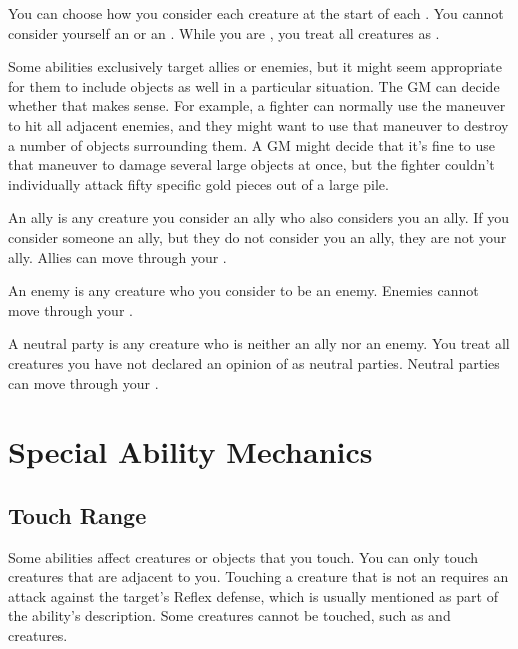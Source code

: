     You can choose how you consider each creature at the start of each .
    You cannot consider yourself an  or an .
    While you are \unconscious, you treat all creatures as .

    Some abilities exclusively target allies or enemies, but it might seem appropriate for them to include objects as well in a particular situation.
    The GM can decide whether that makes sense.
    For example, a fighter can normally use the  maneuver to hit all adjacent enemies, and they might want to use that maneuver to destroy a number of objects surrounding them.
    A GM might decide that it's fine to use that maneuver to damage several large objects at once, but the fighter couldn't individually attack fifty specific gold pieces out of a large pile.

     An ally is any creature you consider an ally who also considers you an ally.
    If you consider someone an ally, but they do not consider you an ally, they are not your ally.
    Allies can move through your .

     An enemy is any creature who you consider to be an enemy.
    Enemies cannot move through your .

     A neutral party is any creature who is neither an ally nor an enemy.
    You treat all creatures you have not declared an opinion of as neutral parties.
    Neutral parties can move through your .

\section{Special Ability Mechanics}\label{Special Ability Mechanics}

  \subsection{Touch Range}
    Some abilities affect creatures or objects that you touch.
    You can only touch creatures that are adjacent to you.
    Touching a creature that is not an  requires an attack against the target's Reflex defense, which is usually mentioned as part of the ability's description.
    Some creatures cannot be touched, such as  and  creatures.

